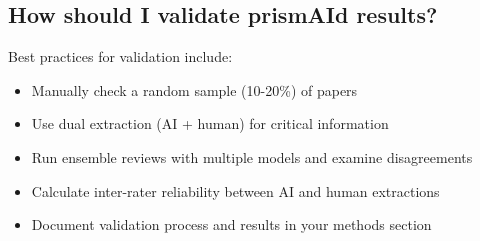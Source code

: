 

\subsection{How should I validate prismAId results?}

Best practices for validation include:

\begin{itemize}
    \item Manually check a random sample (10-20\%) of papers
    \item Use dual extraction (AI + human) for critical information
    \item Run ensemble reviews with multiple models and examine disagreements
    \item Calculate inter-rater reliability between AI and human extractions
    \item Document validation process and results in your methods section
\end{itemize}

